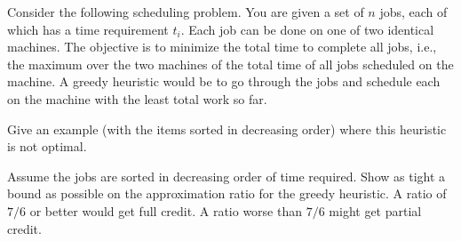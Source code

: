 \newpage
{} %

\problemdes

Consider the following scheduling problem. You are given a set of $n$ jobs, each of which has a time requirement $t_i$. Each job can be done on one of two identical machines. The objective is to minimize the total time to complete all jobs, i.e., the maximum over the two machines of the total time of all jobs scheduled on the machine. A greedy heuristic would be to go through the jobs and schedule each on the machine with the least total work so far.


Give an example (with the items sorted in decreasing order) where this heuristic is not optimal.








Assume the jobs are sorted in decreasing order of time required. Show as tight a bound as possible on the approximation ratio for the greedy heuristic. A ratio of $7/6$ or better would get full credit. A ratio worse than $7/6$ might get partial credit.







